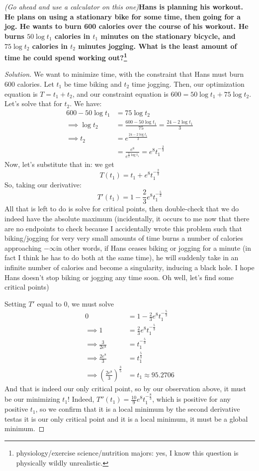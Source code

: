 \documentclass[english]{article}
\newcommand{\prob}[1]{\setcounter{section}{#1-1}\section{}}
\theoremstyle{remark}
\theoremstyle{definition}
\begin{document}
	\prob{11} \emph{(Go ahead and use a calculator on this one\textellipsis)}\newline\textbf{Hans is planning his workout. He plans on using a stationary bike for some time, then going for a jog. He wants to burn 600 calories over the course of his workout. He burns $50\log t_1$ calories in $t_1$ minutes on the stationary bicycle, and $75\log t_2$ calories in $t_2$ minutes jogging. What is the least amount of time he could spend working out?\footnote{physiology/exercise science/nutrition majors: yes, I know this question is physically wildly unrealistic.}}
\begin{proof}[Solution]
	We want to minimize time, with the constraint that Hans must burn 600 calories. Let $t_1$ be time biking and $t_2$ time jogging. Then, our optimization equation is $T=t_1+t_2$, and our constraint equation is $600=50\log t_1+75\log t_2$. Let's solve that for $t_2$. We have:\begin{align*}
	600-50\log t_1&=75\log t_2\\
	\implies \log t_2&=\frac{600-50\log t_1}{75}=\frac{24-2\log t_1}{3}\\
	\implies t_2&=e^{\frac{24-2\log t_1}{3}}\\&=\frac{e^8}{e^{\frac{2}{3}\log t_1}}=e^8t_1^{-\frac{2}{3}}
	\end{align*}
	Now, let's substitute that in: we get $$T(t_1)=t_1+e^8t_1^{-\frac{2}{3}}$$
	So, taking our derivative:
	$$T'(t_1)=1-\frac{2}{3}e^8t_1^{-\frac{5}{3}}$$
	All that is left to do is solve for critical points, then double-check that we do indeed have the absolute maximum (incidentally, it occurs to me now that there are no endpoints to check because I accidentally wrote this problem such that biking/jogging for very very small amounts of time burns a number of calories approaching $-\infty$\textemdash in other words, if Hans ceases biking or jogging for a minute (in fact I think he has to do both at the same time), he will suddenly take in an infinite number of calories and become a singularity, inducing a black hole. I hope Hans doesn't stop biking or jogging any time soon. Oh well, let's find some critical points)
	
	Setting $T'$ equal to $0$, we must solve \begin{align*}
		0&=1-\frac{2}{3}e^8t_1^{-\frac{5}{3}}\\
		\implies 1&=\frac{2}{3}e^8t_1^{-\frac{5}{3}}\\
		\implies \frac{3}{2e^8}&=t_1^{-\frac{5}{3}}\\
		\implies \frac{2e^8}{3}&=t_1^\frac{5}{3}\\
		\implies \left(\frac{2e^8}{3}\right)^\frac{3}{5}&=t_1\approx 95.2706
	\end{align*}
	And that is indeed our only critical point, so by our observation above, it must be our minimizing $t_1$! Indeed, $T''(t_1)=\frac{10}{9}e^8t_1^{-\frac{8}{3}}$, which is positive for any positive $t_1$, so we confirm that it is a local minimum by the second derivative test\textemdash as it is our only critical point and it is a local minimum, it must be a global minimum.
	

\end{proof}
\end{document}
